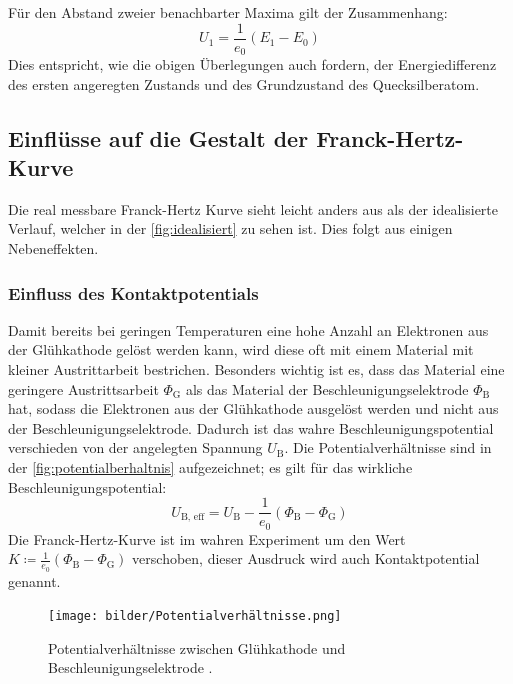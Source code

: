     \noindent Für den Abstand zweier benachbarter Maxima gilt der Zusammenhang:
    \begin{equation}\label{eqn:anregungsenergie}
        U_1 = \frac{1}{e_0} \left( E_1 - E_0 \right)
    \end{equation}
    Dies entspricht, wie die obigen Überlegungen auch fordern, der Energiedifferenz des ersten angeregten Zustands und des Grundzustand des Quecksilberatom. 

\subsection{Einflüsse auf die Gestalt der Franck-Hertz-Kurve}

    Die real messbare Franck-Hertz Kurve sieht leicht anders aus als der idealisierte Verlauf, welcher in der \autoref{fig:idealisiert} zu sehen ist. 
    Dies folgt aus einigen Nebeneffekten. 

    \subsubsection{Einfluss des Kontaktpotentials}

        Damit bereits bei geringen Temperaturen eine hohe Anzahl an Elektronen aus der Glühkathode gelöst werden kann, wird diese oft mit einem Material mit 
        kleiner Austrittarbeit bestrichen. Besonders wichtig ist es, dass das Material eine geringere Austrittsarbeit $\Phi_{\text{G}}$ als das Material der Beschleunigungselektrode $\Phi_{\text{B}}$ 
        hat, sodass die Elektronen aus der Glühkathode ausgelöst werden und nicht aus der Beschleunigungselektrode. Dadurch ist das wahre Beschleunigungspotential 
        verschieden von der angelegten Spannung $U_{\text{B}}$. Die Potentialverhältnisse sind in der \autoref{fig:potentialberhaltnis} aufgezeichnet; 
        es gilt für das wirkliche Beschleunigungspotential:
        \begin{equation}\label{eqn:Kontaktpotential}
            U_{\text{B, eff}} = U_{\text{B}} - \frac{1}{e_0} \left( \Phi_{\text{B}} - \Phi_{\text{G}} \right)
        \end{equation}
        Die Franck-Hertz-Kurve ist im wahren Experiment um den Wert $K \coloneq \frac{1}{e_0} \left( \Phi_{\text{B}} - \Phi_{\text{G}} \right)$ verschoben, dieser 
        Ausdruck wird auch Kontaktpotential genannt. 

        \begin{figure}[H]
            \centering 
            \texttt{[image: bilder/Potentialverhältnisse.png]}
            \caption{Potentialverhältnisse zwischen Glühkathode und Beschleunigungselektrode \cite{anleitung}.}
            \label{fig:potentialberhaltnis}
        \end{figure}


